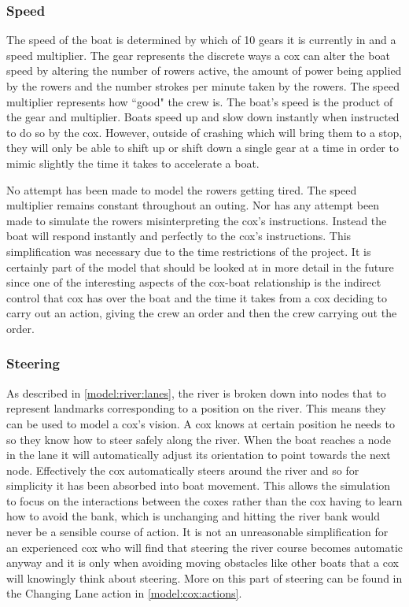       \subsubsection{Speed}
      The speed of the boat is determined by which of 10 gears it is currently in and a speed multiplier. The gear represents the discrete ways a cox can alter the boat speed by altering the number of rowers active, the amount of power being applied by the rowers and the number strokes per minute taken by the rowers. The speed multiplier represents how ``good" the crew is. The boat's speed is the product of the gear and multiplier. Boats speed up and slow down instantly when instructed to do so by the cox. However, outside of crashing which will bring them to a stop, they will only be able to shift up or shift down a single gear at a time in order to mimic slightly the time it takes to accelerate a boat.
      
      No attempt has been made to model the rowers getting tired. The speed multiplier remains constant throughout an outing. Nor has any attempt been made to simulate the rowers misinterpreting the cox's instructions. Instead the boat will respond instantly and perfectly to the cox's instructions. This simplification was necessary due to the time restrictions of the project. It is certainly part of the model that should be looked at in more detail in the future since one of the interesting aspects of the cox-boat relationship is the indirect control that cox has over the boat and the time it takes from a cox deciding to carry out an action, giving the crew an order and then the crew carrying out the order.
      
      \subsubsection{Steering}
      As described in \ref{model:river:lanes}, the river is broken down into nodes that to represent landmarks corresponding to a position on the river. This means they can be used to model a cox's vision. A cox knows at certain position he needs to so they know how to steer safely along the river. When the boat reaches a node in the lane it will automatically adjust its orientation to point towards the next node. Effectively the cox automatically steers around the river and so for simplicity it has been absorbed into boat movement. This allows the simulation to focus on the interactions between the coxes rather than the cox having to learn how to avoid the bank, which is unchanging and hitting the river bank would never be a sensible course of action. It is not an unreasonable simplification for an experienced cox who will find that steering the river course becomes automatic anyway and it is only when avoiding moving obstacles like other boats that a cox will knowingly think about steering. More on this part of steering can be found in the Changing Lane action in \ref{model:cox:actions}.
      
